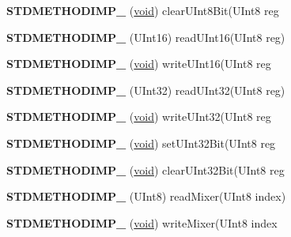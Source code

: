 \begin{DoxyCompactItemize}
\item 
\mbox{\label{class_c_c_m_i_adapter_a7feeec1117800f827ca4c3fd472ba877}} 
{\bfseries S\+T\+D\+M\+E\+T\+H\+O\+D\+I\+M\+P\+\_\+} (\hyperlink{interfacevoid}{void}) clear\+U\+Int8\+Bit(U\+Int8 reg
\item 
\mbox{\label{class_c_c_m_i_adapter_a11ee82999495fbc27050b0bfdd88cb81}} 
{\bfseries S\+T\+D\+M\+E\+T\+H\+O\+D\+I\+M\+P\+\_\+} (U\+Int16) read\+U\+Int16(U\+Int8 reg)
\item 
\mbox{\label{class_c_c_m_i_adapter_af7974daa9616a50ebe378ecd26b439be}} 
{\bfseries S\+T\+D\+M\+E\+T\+H\+O\+D\+I\+M\+P\+\_\+} (\hyperlink{interfacevoid}{void}) write\+U\+Int16(U\+Int8 reg
\item 
\mbox{\label{class_c_c_m_i_adapter_a07a7fea1d668cde8a13cc4f3506bebeb}} 
{\bfseries S\+T\+D\+M\+E\+T\+H\+O\+D\+I\+M\+P\+\_\+} (U\+Int32) read\+U\+Int32(U\+Int8 reg)
\item 
\mbox{\label{class_c_c_m_i_adapter_a803934da4c4ca72c4f4a738848f7bb52}} 
{\bfseries S\+T\+D\+M\+E\+T\+H\+O\+D\+I\+M\+P\+\_\+} (\hyperlink{interfacevoid}{void}) write\+U\+Int32(U\+Int8 reg
\item 
\mbox{\label{class_c_c_m_i_adapter_aefecdcaa741306be58eb762967ce4456}} 
{\bfseries S\+T\+D\+M\+E\+T\+H\+O\+D\+I\+M\+P\+\_\+} (\hyperlink{interfacevoid}{void}) set\+U\+Int32\+Bit(U\+Int8 reg
\item 
\mbox{\label{class_c_c_m_i_adapter_a4bd1167e6155cc68d7aed3f11ab5719b}} 
{\bfseries S\+T\+D\+M\+E\+T\+H\+O\+D\+I\+M\+P\+\_\+} (\hyperlink{interfacevoid}{void}) clear\+U\+Int32\+Bit(U\+Int8 reg
\item 
\mbox{\label{class_c_c_m_i_adapter_a865f443f216dbb612644dccd8f3eaef3}} 
{\bfseries S\+T\+D\+M\+E\+T\+H\+O\+D\+I\+M\+P\+\_\+} (U\+Int8) read\+Mixer(U\+Int8 index)
\item 
\mbox{\label{class_c_c_m_i_adapter_a65ce23eb15d3e527c23ba67de5f919f2}} 
{\bfseries S\+T\+D\+M\+E\+T\+H\+O\+D\+I\+M\+P\+\_\+} (\hyperlink{interfacevoid}{void}) write\+Mixer(U\+Int8 index

\end{DoxyCompactItemize}
